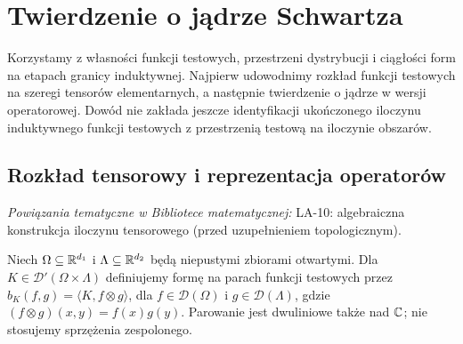 
\section{Twierdzenie o jądrze Schwartza}
\label{sec:dt-schwartz-kernel}
\providecommand{\atlasref}[2]{#2}

Korzystamy z własności funkcji testowych, przestrzeni
dystrybucji i ciągłości form na etapach granicy induktywnej.
Najpierw udowodnimy rozkład funkcji testowych na szeregi
tensorów elementarnych, a następnie twierdzenie o jądrze
w wersji operatorowej. Dowód nie zakłada jeszcze
identyfikacji ukończonego iloczynu induktywnego funkcji
testowych z przestrzenią testową na iloczynie obszarów.

\subsection{Rozkład tensorowy i reprezentacja operatorów}

\noindent\emph{Powiązania tematyczne w Bibliotece matematycznej:} \atlasref{LA-10::thm:lin10-istnienie}{LA-10: algebraiczna konstrukcja iloczynu tensorowego (przed uzupełnieniem topologicznym)}.


\begin{definicja}
\label{def:kernel-pair23}
Niech $\Omega\subseteq\mathbb R^{d_1}$ i
$\Lambda\subseteq\mathbb R^{d_2}$ będą niepustymi zbiorami otwartymi.
Dla $K\in\mathcal D'(\Omega\times\Lambda)$ definiujemy
formę na parach funkcji testowych przez
$b_K(f,g)=\langle K,f\otimes g\rangle$,
dla $f\in\mathcal D(\Omega)$ i $g\in\mathcal D(\Lambda)$,
gdzie $(f\otimes g)(x,y)=f(x)g(y)$.
Parowanie jest dwuliniowe także nad $\mathbb C$; nie stosujemy
sprzężenia zespolonego.
\end{definicja}

